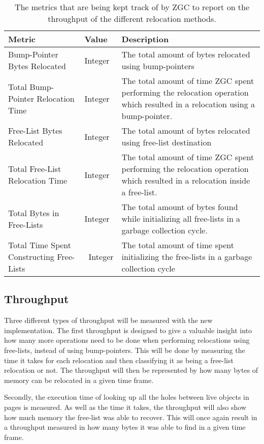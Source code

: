 \begin{table}[H]
  \centering
  \begin{tabular}{|p{4cm}|l|p{6cm}|}
    \hline
    Metric & Value & Description \\ \hline
    Bump-Pointer Bytes Relocated & Integer & The total amount of bytes relocated using bump-pointers \\ \hline
    Total Bump-Pointer Relocation Time & Integer & The total amount of time ZGC spent performing the relocation operation which resulted in a relocation using a bump-pointer. \\ \hline
    Free-List Bytes Relocated & Integer & The total amount of bytes relocated using free-list destination \\ \hline
    Total Free-List Relocation Time & Integer & The total amount of time ZGC spent performing the relocation operation which resulted in a relocation inside a free-list. \\ \hline
    Total Bytes in Free-Lists & Integer & The total amount of bytes found while initializing all free-lists in a garbage collection cycle. \\ \hline
    Total Time Spent Constructing Free-Lists &  Integer & The total amount of time spent initializing the free-lists in a garbage collection cycle \\ \hline
  \end{tabular}
  \caption{The metrics that are being kept track of by ZGC to report on the throughput of the different relocation methods.}
  \label{table:gc_logs_throughput}
\end{table}

\subsection{Throughput}
Three different types of throughput will be measured with the new implementation. The first throughput is designed to give a valuable insight into how many more operations need to be done when performing relocations using free-lists, instead of using bump-pointers. This will be done by measuring the time it takes for each relocation and then classifying it as being a free-list relocation or not. The throughput will then be represented by how many bytes of memory can be relocated in a given time frame.

Secondly, the execution time of looking up all the holes between live objects in pages is measured. As well as the time it takes, the throughput will also show how much memory the free-list was able to recover. This will once again result in a throughput measured in how many bytes it was able to find in a given time frame.

